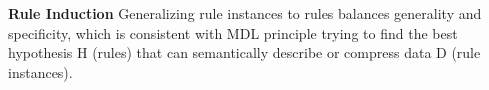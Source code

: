 






%

\textbf{Rule Induction}
Generalizing rule instances to rules balances generality and specificity, which is consistent with MDL principle \cite{rissanen1978mdl} trying to find the best hypothesis H (rules) that can semantically describe or compress data D (rule instances).
 
